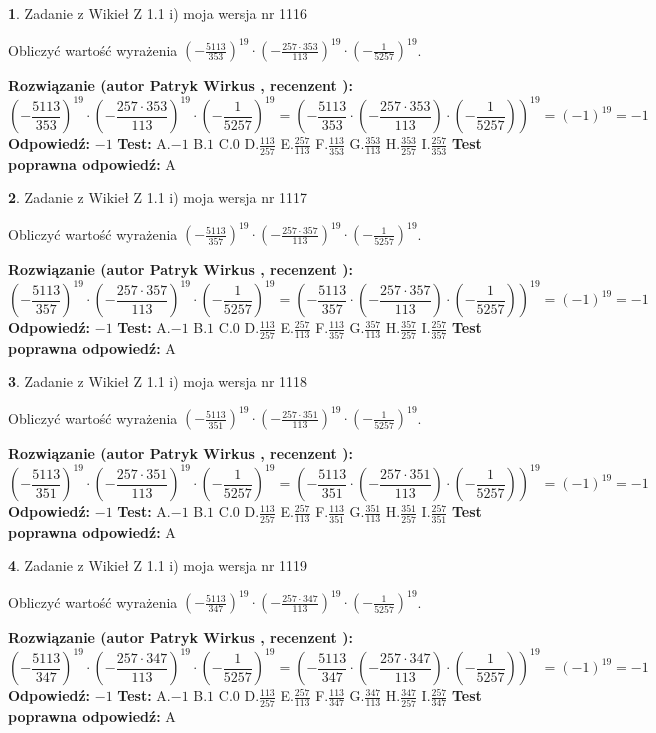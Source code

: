 \documentclass[12pt, a4paper]{article}
\theoremstyle{definition} %
\newtheorem{zad}{}
\newcommand{\zadStart}[1]{\begin{zad}#1\newline}
\newcommand{\zadStop}{\end{zad}}
\newcommand{\rozwStart}[2]{\noindent \textbf{Rozwiązanie (autor #1 , recenzent #2): }\newline}
\newcommand{\rozwStop}{\newline}
\newcommand{\odpStart}{\noindent \textbf{Odpowiedź:}\newline}
\newcommand{\odpStop}{\newline}
\newcommand{\testStart}{\noindent \textbf{Test:}\newline}
\newcommand{\testStop}{\newline}
\newcommand{\kluczStart}{\noindent \textbf{Test poprawna odpowiedź:}\newline}
\newcommand{\kluczStop}{\newline}
\begin{document}
\zadStart{Zadanie z Wikieł Z 1.1 i) moja wersja nr 1116}

Obliczyć wartość wyrażenia $(-\frac{5113}{353})^{19} \cdot (-\frac{257 \cdot 353}{113})^{19} \cdot (-\frac{1}{5257})^{19}$.
\zadStop
\rozwStart{Patryk Wirkus}{}
$$(-\frac{5113}{353})^{19} \cdot (-\frac{257 \cdot 353}{113})^{19} \cdot (-\frac{1}{5257})^{19} = (-\frac{5113}{353} \cdot (-\frac{257 \cdot 353}{113}) \cdot (-\frac{1}{5257}))^{19} = (-1)^{19} = -1$$
\rozwStop
\odpStart
$-1$
\odpStop
\testStart
A.$-1$ B.$1$ C.$0$ D.$\frac{113}{257}$ E.$\frac{257}{113}$
F.$\frac{113}{353}$ G.$\frac{353}{113}$
H.$\frac{353}{257}$
I.$\frac{257}{353}$
\testStop
\kluczStart
A
\kluczStop



\zadStart{Zadanie z Wikieł Z 1.1 i) moja wersja nr 1117}

Obliczyć wartość wyrażenia $(-\frac{5113}{357})^{19} \cdot (-\frac{257 \cdot 357}{113})^{19} \cdot (-\frac{1}{5257})^{19}$.
\zadStop
\rozwStart{Patryk Wirkus}{}
$$(-\frac{5113}{357})^{19} \cdot (-\frac{257 \cdot 357}{113})^{19} \cdot (-\frac{1}{5257})^{19} = (-\frac{5113}{357} \cdot (-\frac{257 \cdot 357}{113}) \cdot (-\frac{1}{5257}))^{19} = (-1)^{19} = -1$$
\rozwStop
\odpStart
$-1$
\odpStop
\testStart
A.$-1$ B.$1$ C.$0$ D.$\frac{113}{257}$ E.$\frac{257}{113}$
F.$\frac{113}{357}$ G.$\frac{357}{113}$
H.$\frac{357}{257}$
I.$\frac{257}{357}$
\testStop
\kluczStart
A
\kluczStop



\zadStart{Zadanie z Wikieł Z 1.1 i) moja wersja nr 1118}

Obliczyć wartość wyrażenia $(-\frac{5113}{351})^{19} \cdot (-\frac{257 \cdot 351}{113})^{19} \cdot (-\frac{1}{5257})^{19}$.
\zadStop
\rozwStart{Patryk Wirkus}{}
$$(-\frac{5113}{351})^{19} \cdot (-\frac{257 \cdot 351}{113})^{19} \cdot (-\frac{1}{5257})^{19} = (-\frac{5113}{351} \cdot (-\frac{257 \cdot 351}{113}) \cdot (-\frac{1}{5257}))^{19} = (-1)^{19} = -1$$
\rozwStop
\odpStart
$-1$
\odpStop
\testStart
A.$-1$ B.$1$ C.$0$ D.$\frac{113}{257}$ E.$\frac{257}{113}$
F.$\frac{113}{351}$ G.$\frac{351}{113}$
H.$\frac{351}{257}$
I.$\frac{257}{351}$
\testStop
\kluczStart
A
\kluczStop



\zadStart{Zadanie z Wikieł Z 1.1 i) moja wersja nr 1119}

Obliczyć wartość wyrażenia $(-\frac{5113}{347})^{19} \cdot (-\frac{257 \cdot 347}{113})^{19} \cdot (-\frac{1}{5257})^{19}$.
\zadStop
\rozwStart{Patryk Wirkus}{}
$$(-\frac{5113}{347})^{19} \cdot (-\frac{257 \cdot 347}{113})^{19} \cdot (-\frac{1}{5257})^{19} = (-\frac{5113}{347} \cdot (-\frac{257 \cdot 347}{113}) \cdot (-\frac{1}{5257}))^{19} = (-1)^{19} = -1$$
\rozwStop
\odpStart
$-1$
\odpStop
\testStart
A.$-1$ B.$1$ C.$0$ D.$\frac{113}{257}$ E.$\frac{257}{113}$
F.$\frac{113}{347}$ G.$\frac{347}{113}$
H.$\frac{347}{257}$
I.$\frac{257}{347}$
\testStop
\kluczStart
A
\kluczStop
\end{document}
